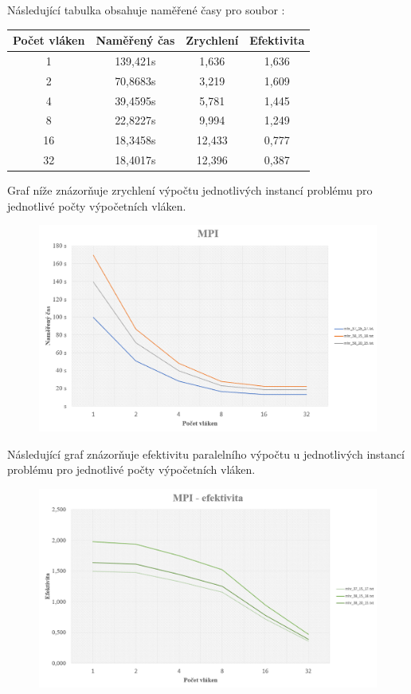\documentclass{article}
\begin{document}
\noindent Následující tabulka obsahuje naměřené časy pro soubor :
\begin{table}[H]\centering
    \begin{tabular}{|c|c|c|c|}
        \hline \textbf{Počet vláken} & \textbf{Naměřený čas} & \textbf{Zrychlení} & \textbf{Efektivita} \\ \hline \hline
        1 & 139,421s & 1,636 & 1,636 \\ \hline
        2 &	70,8683s & 3,219 & 1,609 \\ \hline
        4 &	39,4595s & 5,781 & 1,445 \\ \hline
        8 &	22,8227s & 9,994 & 1,249 \\ \hline
        16 & 18,3458s & 12,433 & 0,777 \\ \hline
        32 & 18,4017s & 12,396 & 0,387 \\ \hline
    \end{tabular}
\end{table} 

\noindent Graf níže znázorňuje zrychlení výpočtu jednotlivých instancí problému pro jednotlivé počty výpočetních vláken.

\begin{figure}[H]
    \centering
    \includegraphics[width=\textwidth]{MPIGraf.png}
\end{figure}

\noindent Následující graf znázorňuje efektivitu paralelního výpočtu u jednotlivých instancí problému pro jednotlivé počty výpočetních vláken.

\begin{figure}[H]
    \centering
    \includegraphics[width=\textwidth]{EfektivitaMPI.png}
\end{figure}
\end{document}
